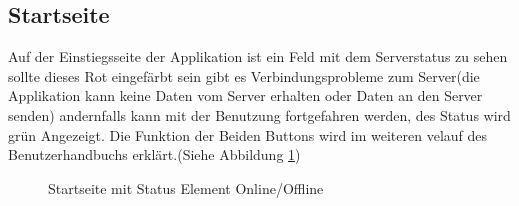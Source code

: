 \subsection{Startseite}
Auf der Einstiegsseite der Applikation ist ein Feld mit dem Serverstatus zu sehen sollte dieses Rot eingefärbt sein gibt es Verbindungsprobleme zum Server(die Applikation kann keine Daten vom Server erhalten oder Daten an den Server senden) andernfalls kann mit der Benutzung fortgefahren werden, des Status wird grün Angezeigt. Die Funktion der Beiden Buttons wird im weiteren velauf des Benutzerhandbuchs erklärt.(Siehe Abbildung \ref{img:onlineOffline})
\\
\begin{figure}[H]
    \centering
    \qquad
    \caption{Startseite mit Status Element Online/Offline}
    \label{img:onlineOffline}
\end{figure}
\\
